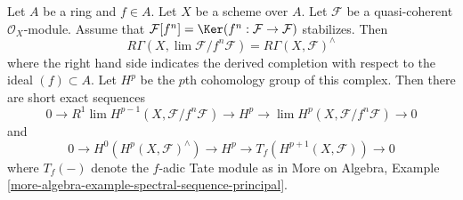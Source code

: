 \begin{lemma}
\label{lemma-formal-functions-principal}
\begin{reference}
\cite[Lemma 1.6]{Bhatt-local}
\end{reference}
Let $A$ be a ring and $f \in A$. Let $X$ be a scheme over $A$.
Let $\mathcal{F}$ be a quasi-coherent $\mathcal{O}_X$-module.
Assume that $\mathcal{F}[f^n] = \Ker(f^n : \mathcal{F} \to \mathcal{F})$
stabilizes. Then
$$
R\Gamma(X, \lim \mathcal{F}/f^n\mathcal{F}) =
R\Gamma(X, \mathcal{F})^\wedge
$$
where the right hand side indicates the derived completion
with respect to the ideal $(f) \subset A$. Let $H^p$ be the
$p$th cohomology group of this complex. Then there are short
exact sequences
$$
0 \to R^1\lim H^{p - 1}(X, \mathcal{F}/f^n\mathcal{F})
\to H^p \to \lim H^p(X, \mathcal{F}/f^n\mathcal{F}) \to 0
$$
and
$$
0 \to H^0(H^p(X, \mathcal{F})^\wedge) \to H^p \to
T_f(H^{p + 1}(X, \mathcal{F})) \to 0
$$
where $T_f(-)$ denote the $f$-adic Tate module as in
More on Algebra, Example
\ref{more-algebra-example-spectral-sequence-principal}.
\end{lemma}

